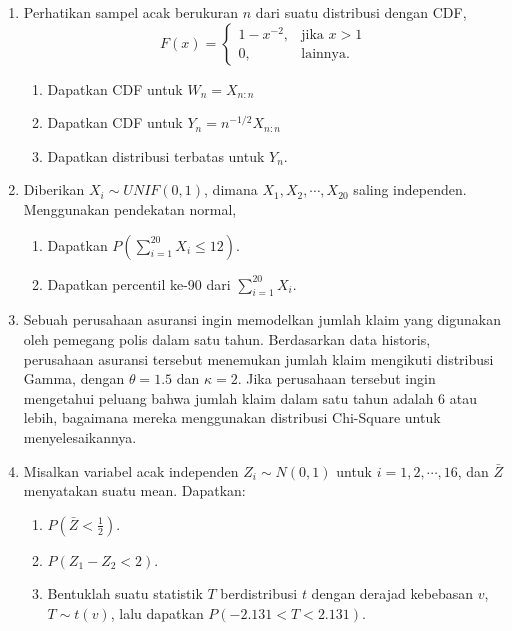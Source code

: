 \documentclass[11pt,letterpaper]{article}
\begin{document}
\begin{enumerate}
  \item Perhatikan sampel acak berukuran $n$ dari suatu distribusi dengan CDF,
        \[
          F(x) = \begin{cases}
            1 - x^{-2}, & \text{jika } x > 1 \\
            0,          & \text{lainnya.}
          \end{cases}
        \]
        \begin{enumerate}[label=(\alph*)]
          \item Dapatkan CDF untuk $W_n = X_{n:n}$
          \item Dapatkan CDF untuk $Y_n = n^{-1/2}X_{n:n}$
          \item Dapatkan distribusi terbatas untuk $Y_n$.
        \end{enumerate}


  \item Diberikan $X_i \sim UNIF(0, 1)$, dimana $X_1, X_2, \cdots, X_{20}$ saling independen. Menggunakan pendekatan normal,
        \begin{enumerate}[label=(\alph*)]
          \item Dapatkan $P\left( \sum_{i=1}^{20} X_i \le 12 \right)$.
          \item Dapatkan percentil ke-90 dari $\sum_{i=1}^{20} X_i$.
        \end{enumerate}


  \item Sebuah perusahaan asuransi ingin memodelkan jumlah klaim yang digunakan oleh pemegang polis dalam satu tahun. Berdasarkan data historis, perusahaan asuransi tersebut menemukan jumlah klaim mengikuti distribusi Gamma, dengan $\theta = 1.5$ dan $\kappa = 2$. Jika perusahaan tersebut ingin mengetahui peluang bahwa jumlah klaim dalam satu tahun adalah 6 atau lebih, bagaimana mereka menggunakan distribusi Chi-Square untuk menyelesaikannya.


  \item Misalkan variabel acak independen $Z_i \sim N(0, 1)$ untuk $i = 1, 2, \cdots, 16$, dan $\bar{Z}$ menyatakan suatu mean. Dapatkan:
        \begin{enumerate}[label=(\alph*)]
          \item $P\left(\bar{Z} < \frac{1}{2}\right)$.
          \item $P(Z_1 - Z_2 < 2)$.
          \item Bentuklah suatu statistik $T$ berdistribusi $t$ dengan derajad kebebasan $v$, $T \sim t(v)$, lalu dapatkan $P(-2.131 < T < 2.131)$.
        \end{enumerate}
\end{enumerate}
\end{document}
